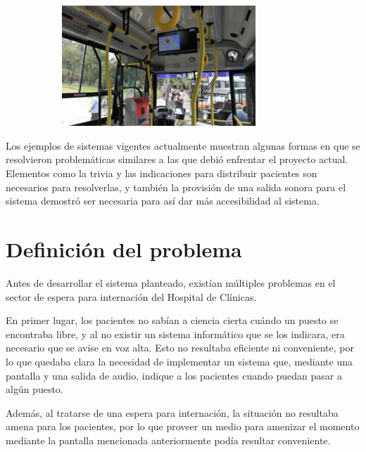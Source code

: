 \documentclass{article}
\begin{document}
\begin{figure}[H]
	\caption{Colectivo con pantalla que muestra información relevante}
    \begin{subfigure}{1.0\textwidth}
	\includegraphics[width=0.8\textwidth]{colectivo.png}
    \end{subfigure}
	\label{fig:colectivo}
\end{figure}
\vspace{-1.0\baselineskip}
Los ejemplos de sistemas vigentes actualmente muestran algunas formas en que se resolvieron problemáticas similares a las que debió enfrentar el proyecto actual. Elementos como la trivia y las indicaciones para distribuir pacientes son necesarios para resolverlas, y también la provisión de una salida sonora para el sistema demostró ser necesaria para así dar más accesibilidad al sistema.
\newpage
\section{Definición del problema}
Antes de desarrollar el sistema planteado, existían múltiples problemas en el sector de espera para internación del Hospital de Clínicas.

En primer lugar, los pacientes no sabían a ciencia cierta cuándo un puesto se encontraba libre, y al no existir un sistema informático que se los indicara, era necesario que se avise en voz alta. Esto no resultaba eficiente ni conveniente, por lo que quedaba clara la necesidad de implementar un sistema que, mediante una pantalla y una salida de audio, indique a los pacientes cuando puedan pasar a algún puesto.

Además, al tratarse de una espera para internación, la situación no resultaba amena para los pacientes, por lo que proveer un medio para amenizar el momento mediante la pantalla mencionada anteriormente podía resultar conveniente.
\end{document}
